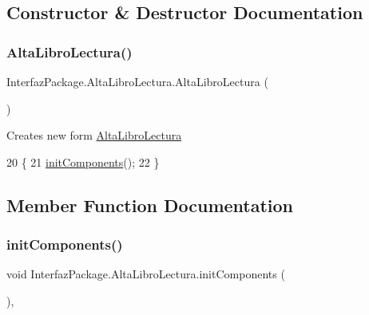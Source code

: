 \subsection{Constructor \& Destructor Documentation}
\mbox{\label{class_interfaz_package_1_1_alta_libro_lectura_ad5a9ed62b2923309a5aebfa87cebc4b2}} 
\subsubsection{\texorpdfstring{Alta\+Libro\+Lectura()}{AltaLibroLectura()}}
{\footnotesize\ttfamily Interfaz\+Package.\+Alta\+Libro\+Lectura.\+Alta\+Libro\+Lectura (\begin{DoxyParamCaption}{ }\end{DoxyParamCaption})\hspace{0.3cm}{\ttfamily [inline]}}

Creates new form \mbox{\hyperlink{class_interfaz_package_1_1_alta_libro_lectura}{Alta\+Libro\+Lectura}} 
\begin{DoxyCode}
20                               \{
21         \mbox{\hyperlink{class_interfaz_package_1_1_alta_libro_lectura_a7355e006e518b1bfec8c9b89fb1a4430}{initComponents}}();
22     \}
\end{DoxyCode}


\subsection{Member Function Documentation}
\mbox{\label{class_interfaz_package_1_1_alta_libro_lectura_a7355e006e518b1bfec8c9b89fb1a4430}} 
\subsubsection{\texorpdfstring{init\+Components()}{initComponents()}}
{\footnotesize\ttfamily void Interfaz\+Package.\+Alta\+Libro\+Lectura.\+init\+Components (\begin{DoxyParamCaption}{ }\end{DoxyParamCaption})\hspace{0.3cm}{\ttfamily [inline]}, {\ttfamily [private]}}

